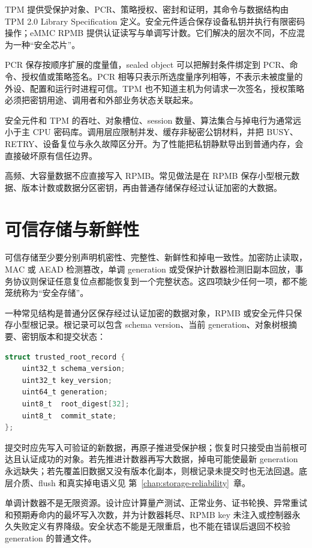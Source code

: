 TPM 提供受保护对象、PCR、策略授权、密封和证明，其命令与数据结构由 TPM 2.0 Library Specification 定义\cite{tcg-tpm2-library}。安全元件适合保存设备私钥并执行有限密码操作；eMMC RPMB 提供认证读写与单调写计数。它们解决的层次不同，不应混为一种“安全芯片”。

PCR 保存按顺序扩展的度量值，sealed object 可以把解封条件绑定到 PCR、命令、授权值或策略签名。PCR 相等只表示所选度量序列相等，不表示未被度量的外设、配置和运行时进程可信。TPM 也不知道主机为何请求一次签名，授权策略必须把密钥用途、调用者和外部业务状态关联起来。

安全元件和 TPM 的吞吐、对象槽位、session 数量、算法集合与掉电行为通常远小于主 CPU 密码库。调用层应限制并发、缓存非秘密公钥材料，并把 BUSY、RETRY、设备复位与永久故障区分开。为了性能把私钥静默导出到普通内存，会直接破坏原有信任边界。

高频、大容量数据不应直接写入 RPMB。常见做法是在 RPMB 保存小型根元数据、版本计数或数据分区密钥，再由普通存储保存经过认证加密的大数据。

\section{可信存储与新鲜性}

可信存储至少要分别声明机密性、完整性、新鲜性和掉电一致性。加密防止读取，MAC 或 AEAD 检测篡改，单调 generation 或受保护计数器检测旧副本回放，事务协议则保证任意复位点都能恢复到一个完整状态。这四项缺少任何一项，都不能笼统称为“安全存储”。

一种常见结构是普通分区保存经过认证加密的数据对象，RPMB 或安全元件只保存小型根记录。根记录可以包含 schema version、当前 generation、对象树根摘要、密钥版本和提交状态：

\noindent\begin{minipage}{\textwidth}
\begin{lstlisting}[language=C,caption={可信存储根记录（示意）}]
struct trusted_root_record {
    uint32_t schema_version;
    uint32_t key_version;
    uint64_t generation;
    uint8_t  root_digest[32];
    uint8_t  commit_state;
};
\end{lstlisting}
\end{minipage}

提交时应先写入可验证的新数据，再原子推进受保护根；恢复时只接受由当前根可达且认证成功的对象。若先推进计数器再写大数据，掉电可能使最新 generation 永远缺失；若先覆盖旧数据又没有版本化副本，则根记录未提交时也无法回退。底层介质、flush 和真实掉电语义见 \mbox{第~\ref{chap:storage-reliability}~章}。

单调计数器不是无限资源。设计应计算量产测试、正常业务、证书轮换、异常重试和预期寿命内的最坏写入次数，并为计数器耗尽、RPMB key 未注入或控制器永久失败定义有界降级。安全状态不能是无限重启，也不能在错误后退回不校验 generation 的普通文件。

